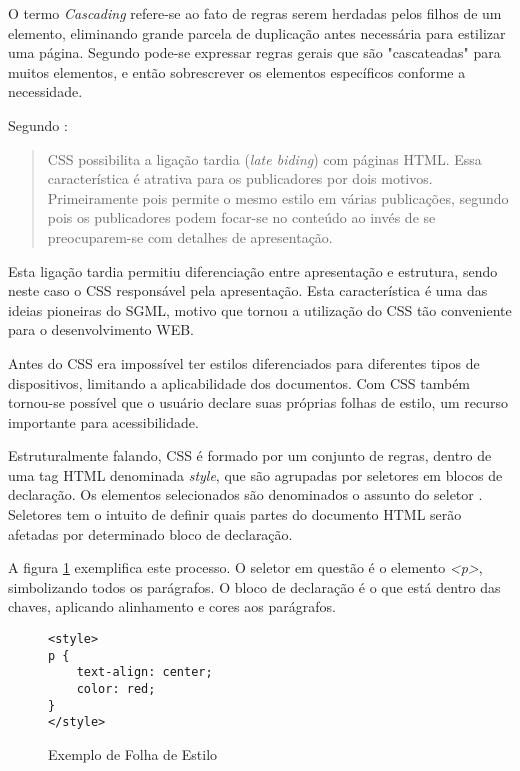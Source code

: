 O termo \textit{Cascading} refere-se ao fato de regras serem
herdadas pelos filhos de um elemento, eliminando grande parcela de
duplicação antes necessária para estilizar uma página. Segundo
\cite{html5mostwanted} pode-se expressar regras gerais que são
"cascateadas" para muitos elementos, e então sobrescrever os elementos
específicos conforme a necessidade.

Segundo \cite[pp. 23--24]{CascadingStyleSheets}:
\begin{quote}
CSS possibilita a ligação tardia (\textit{late biding}) com
páginas HTML. Essa característica é atrativa para os publicadores
por dois motivos. Primeiramente pois permite o mesmo estilo em várias
publicações, segundo pois os publicadores podem focar-se no conteúdo
ao invés de se preocuparem-se com detalhes de apresentação.
\end{quote}

Esta ligação tardia permitiu diferenciação entre apresentação e
estrutura, sendo neste caso o CSS responsável pela apresentação. Esta
característica é uma das ideias pioneiras do SGML, motivo que tornou a
utilização do CSS tão conveniente para o desenvolvimento WEB.

Antes do CSS era impossível ter estilos diferenciados para diferentes
tipos de dispositivos, limitando a aplicabilidade dos documentos.
Com CSS também tornou-se possível que o usuário declare suas próprias
folhas de estilo, um recurso importante para acessibilidade.

Estruturalmente falando, CSS é formado por um conjunto de regras,
dentro de uma tag HTML denominada \textit{style}, que são agrupadas
por seletores em blocos de declaração. Os elementos selecionados são
denominados o assunto do seletor \autocite{cssSelectors}. Seletores tem
o intuito de definir quais partes do documento HTML serão afetadas por
determinado bloco de declaração.

A figura \ref{fig:CSSSample} exemplifica este processo. O seletor em
questão é o elemento \textit{<p>}, simbolizando todos os parágrafos. O bloco de
declaração é o que está dentro das chaves, aplicando alinhamento e
cores aos parágrafos.

\begin{figure}
\centering
\begin{verbatim}
<style>
p {
    text-align: center;
    color: red;
}
</style>
\end{verbatim}
\caption{Exemplo de Folha de Estilo}
\label{fig:CSSSample}
\end{figure}

